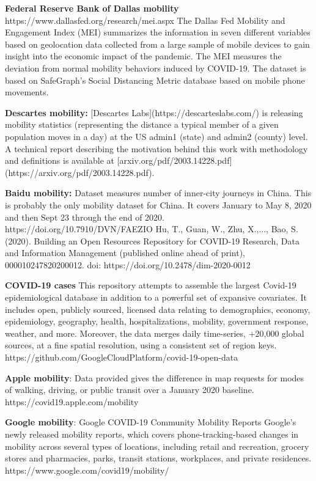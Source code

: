 \documentclass[preprint,12pt]{elsarticle}
\begin{document}
\textbf{Federal Reserve Bank of Dallas mobility}
https://www.dallasfed.org/research/mei.aspx
The Dallas Fed Mobility and Engagement Index (MEI) summarizes the information in seven different variables based on geolocation data collected from a large sample of mobile devices to gain insight into the economic impact of the pandemic. The MEI measures the deviation from normal mobility behaviors induced by COVID-19. The dataset is based on SafeGraph's Social Distancing Metric database based on mobile phone movements.

\textbf{Descartes mobility:}
[Descartes Labs](https://descarteslabs.com/) is releasing mobility
statistics (representing the distance a typical member of a given
population moves in a day) at the US admin1 (state) and admin2
(county) level.  A technical report describing the motivation behind
this work with methodology and definitions is available at
[arxiv.org/pdf/2003.14228.pdf](https://arxiv.org/pdf/2003.14228.pdf).


\textbf{Baidu mobility: }
Dataset measures number of inner-city journeys in China. This is probably the only mobility dataset for China. It covers January to May 8, 2020 and then Sept 23 through the end of 2020.
https://doi.org/10.7910/DVN/FAEZIO
Hu, T., Guan, W., Zhu, X.,...,  Bao, S. (2020). Building an Open Resources Repository for COVID-19 Research, Data and Information Management (published online ahead of print), 000010247820200012. doi: https://doi.org/10.2478/dim-2020-0012 

\textbf{COVID-19 cases}
This repository attempts to assemble the largest Covid-19 epidemiological database in addition to a powerful set of expansive covariates. It includes open, publicly sourced, licensed data relating to demographics, economy, epidemiology, geography, health, hospitalizations, mobility, government response, weather, and more. Moreover, the data merges daily time-series, +20,000 global sources, at a fine spatial resolution, using a consistent set of region keys.
https://github.com/GoogleCloudPlatform/covid-19-open-data

\textbf{Apple mobility}: Data provided gives the difference in map requests for modes of walking, driving, or public transit over a January 2020 baseline.
https://covid19.apple.com/mobility

\textbf{Google mobility}: Google COVID-19 Community Mobility Reports
Google’s newly released mobility reports, which covers phone-tracking-based changes in mobility across several types of locations, including retail and recreation, grocery stores and pharmacies, parks, transit stations, workplaces, and private residences.
https://www.google.com/covid19/mobility/
\end{document}

